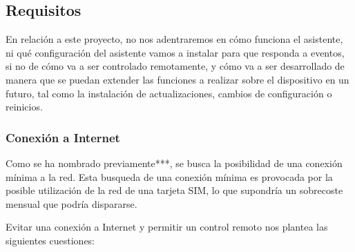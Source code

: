 \subsection{Requisitos}

En relación a este proyecto, no nos adentraremos en cómo funciona el asistente, ni qué configuración del asistente vamos a instalar para que responda a eventos, si no de cómo va a ser controlado remotamente, y cómo va a ser desarrollado de manera que se puedan extender las funciones a realizar sobre el dispositivo en un futuro, tal como la instalación de actualizaciones, cambios de configuración o reinicios.

    \subsubsection{Conexión a Internet}

Como se ha nombrado previamente***, se busca la posibilidad de una conexión mínima a la red. Esta busqueda de una conexión mínima es provocada por la posible utilización de la red de una tarjeta SIM, lo que supondría un sobrecoste mensual que podría dispararse.

Evitar una conexión a Internet y permitir un control remoto nos plantea las siguientes cuestiones:


